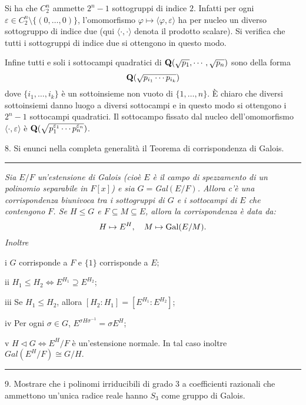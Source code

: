Si ha che $C_2^n$ ammette $2^n-1$ sottogruppi di indice $2$.
Infatti per ogni $\varepsilon\in C_2^n\setminus\{(0,\ldots,0)\}$,
l'omomorfismo $\varphi\mapsto \langle\varphi,\varepsilon\rangle$
ha per nucleo un diverso sottogruppo di indice due (qui
$\langle\cdot,\cdot\rangle$ denota il prodotto scalare). Si
verifica che tutti i sottogruppi di indice due si ottengono in
questo modo.

Infine tutti e soli i sottocampi quadratici di ${\bf
Q}(\sqrt{p_1},\cdots,\sqrt{p_n})$ sono della forma $${\bf
Q}(\sqrt{p_{i_1}\cdots p_{i_k}})$$ dove $\{i_1,\ldots,i_k\}$ \`{e}
un sottoinsieme non vuoto di $\{1,\ldots,n\}$. \`{E} chiaro che
diversi sottoinsiemi danno luogo a diversi sottocampi e in questo
modo si ottengono i $2^n-1$ sottocampi quadratici. Il sottocampo
fissato dal nucleo dell'omomorfismo
$\langle\cdot,\varepsilon\rangle$ \`{e} ${\bf
Q}(\sqrt{p_1^{\varepsilon_1}\cdots p_n^{\varepsilon_n}})$.\rm
\bigskip

\item{8.} Si enunci nella completa generalit\`a il Teorema di
corrispondenza di Galois.

\smallskip{}
\hrule{} {\it Sia $E/F$ un'estensione di
Galois (cio\`{e} $E$ \`{e} il campo di spezzamento di un polinomio
separabile in $F[x]$) e sia $G=${\rm Gal}$(E/F)$. Allora c'\`{e}
una corrispondenza biunivoca tra i sottogruppi di $G$ e i
sottocampi di $E$ che contengono $F$. Se $H\leq G$ e $F\subseteq
M\subseteq E$, allora la corrispondenza \`{e} data da:
$$H\mapsto E^H,\quad M\mapsto {\rm Gal}(E/M).$$
Inoltre \item{i} $G$ corrisponde a $F$ e $\{1\}$ corrisponde a
$E$; \item{ii} $H_1\leq H_2 \Leftrightarrow E^{H_1}\supseteq
E^{H_2}$; \item{iii} Se $H_1\leq H_2$, allora
$[H_2:H_1]=[E^{H_1}:E^{H_2}]$;
 \item{iv} Per ogni $\sigma\in G$,
$E^{\sigma H\sigma^{-1}}=\sigma E^H$; \item{v} $H\triangleleft G
\Leftrightarrow E^H/F$ \`{e} un'estensione normale. In tal caso
inoltre $Gal(E^H/F)\cong G/H.$}
\medskip\hrule
\medskip

\item{9.} Mostrare che i polinomi irriducibili di grado 3 a coefficienti
razionali che ammettono un'unica radice reale hanno  $S_3$ come
gruppo di Galois.

